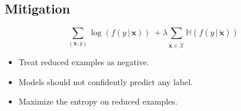 \documentclass[a0,portrait]{a0poster}
\newcommand{\mb}[1]{\boldsymbol{\mathbf{#1}}}
\newcommand{\g}{\, | \,}
\begin{document}
\begin{multicols}{2}
\section*{Mitigation}
\begin{center}
\begin{equation}
\sum_{(\mb{x}, y)}\log(f(y \g \mb{x})) \
+ \lambda\sum_{\tilde{\mb{x}}\in \tilde{\mathcal{X}}}
\mathbb{H}\left(f(y \g \tilde{\mb{x}})\right) \nonumber
\end{equation}
\end{center}
\begin{itemize}
\item Treat reduced examples as negative.
\item Models should not confidently predict any label.
\item Maximize the entropy on reduced examples.
\end{itemize}


% 
% 



% 

\end{multicols}
\end{document}
